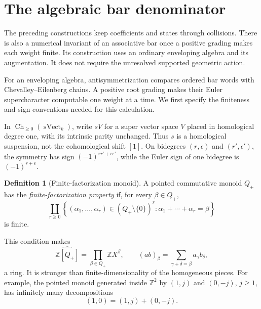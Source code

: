 \documentclass[11pt,reqno]{amsart}
\theoremstyle{definition}
\newtheorem{definition}[theorem]{Definition}
\theoremstyle{remark}
\begin{document}













\section{The algebraic bar denominator}

The preceding constructions keep coefficients and states through
collisions.  There is also a numerical invariant of an associative
bar once a positive grading makes each weight finite.  Its construction
uses an ordinary enveloping algebra and its augmentation.  It does not
require the unresolved supported geometric action.

For an enveloping algebra, antisymmetrization compares ordered bar words
with Chevalley--Eilenberg chains.  A positive root grading makes their
Euler supercharacter computable one weight at a time.  We first specify
the finiteness and sign conventions needed for this calculation.

In \(\operatorname{Ch}_{\ge0}(\operatorname{sVect}_k)\), write \(sV\)
for a super vector space \(V\) placed in homological degree one, with
its intrinsic parity unchanged.  Thus \(s\) is a homological suspension,
not the cohomological shift \([1]\).  On bidegrees
\((r,\epsilon)\) and \((r',\epsilon')\), the symmetry has sign
\((-1)^{rr'+\epsilon\epsilon'}\), while the Euler sign of one
bidegree is \((-1)^{r+\epsilon}\).

\begin{definition}[Finite-factorization monoid]
\label{def:finite-factorization}
A pointed commutative monoid \(Q_+\) has the
\emph{finite-factorization property} if, for every \(\beta\in Q_+\),
\[
 \coprod_{r\ge0}
 \left\{(\alpha_1,\ldots,\alpha_r)
 \in(Q_+\setminus\{0\})^r:
 \alpha_1+\cdots+\alpha_r=\beta\right\}
\]
is finite.
\end{definition}

This condition makes
\[
 \widehat{\mathbb Z[Q_+]}
 =\prod_{\beta\in Q_+}\mathbb Z X^\beta,
 \qquad
 (ab)_\beta=\sum_{\gamma+\delta=\beta}a_\gamma b_\delta,
\]
a ring.  It is stronger than finite-dimensionality of the homogeneous
pieces.  For example, the pointed monoid generated inside
\(\mathbb Z^2\) by \((1,j)\) and \((0,-j)\), \(j\ge1\), has infinitely
many decompositions
\[
 (1,0)=(1,j)+(0,-j).
\]
\end{document}
